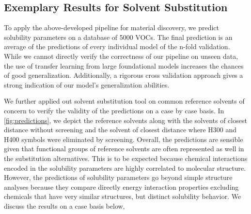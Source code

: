 \documentclass[
  english,        %
  font=times,     %
  onecolumn,      %
]{article}
\begin{document}
\FloatBarrier
\subsection*{Exemplary Results for Solvent Substitution}
To apply the above-developed pipeline for material discovery, we predict solubility parameters on a database of 5000 VOCs\cite{CompsolDatabaseRevised2024}. The final prediction is an average of the predictions of every individual model of the n-fold validation.
While we cannot directly verify the correctness of our pipeline on unseen data, the use of transfer learning from large foundational models increases the chances of good generalization. Additionally,  a rigorous cross validation approach gives a strong indication of our model's generalization abilities.


We further applied out solvent substitution tool on common reference solvents of concern to verify the validity of the predictions on a case by case basis. In \cref{fig:predictions}, we depict the reference solvents along with the solvents of closest distance without screening and the solvent of closest distance where H300 and H400 symbols were eliminated by screening.  Overall, the predictions are sensible given that functional groups of reference solvents are often represented as well in the substitution alternatives.
This is to be expected because chemical interactions encoded in the solubility parameters are highly correlated to molecular structure. However, the predictions of solubility parameters go beyond simple structure analyses because they compare directly energy interaction properties excluding chemicals that have very similar structures, but distinct solubility behavior. We discuss the results on a case basis below,
\end{document}
